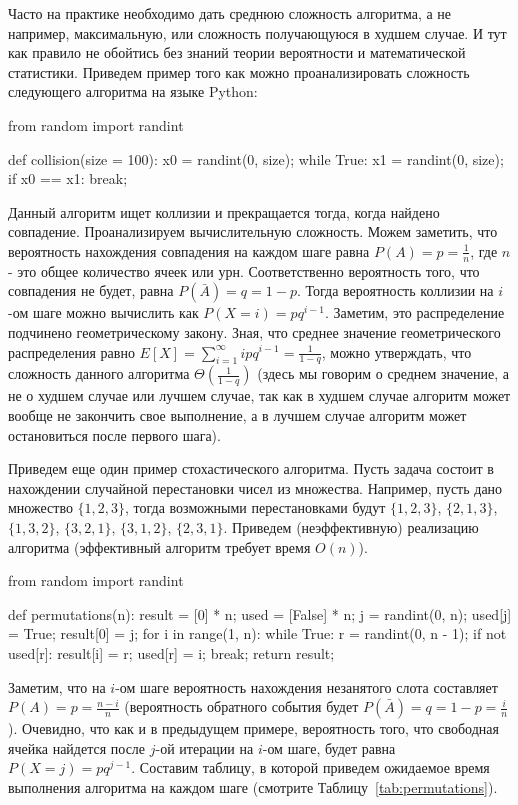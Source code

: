 Часто на практике необходимо дать среднюю сложность алгоритма,
а не например, максимальную, или сложность получающуюся в худшем случае. 
И тут как правило не обойтись без знаний теории вероятности и 
математической статистики. Приведем пример того как можно 
проанализировать сложность следующего алгоритма на языке Python:

\begin{python}
from random import randint

def collision(size = 100):
	x0 = randint(0, size);
	while True:
		x1 = randint(0, size);
		if x0 == x1:
			break;
\end{python}

Данный алгоритм ищет коллизии и прекращается тогда, когда найдено совпадение. Проанализируем
вычислительную сложность. Можем заметить, что вероятность нахождения совпадения на каждом шаге
равна $P(A) = p = \frac{1}{n}$, где $n$ - это общее количество ячеек или урн. Соответственно вероятность
того, что совпадения не будет, равна $P(\bar{A})=q=1-p$. Тогда вероятность 
коллизии на $i$-ом шаге можно вычислить как $P(X=i)=pq^{i-1}$.
Заметим, это распределение подчинено геометрическому закону.
Зная, что среднее значение геометрического распределения равно 
$E[X] = \sum_{i=1}^{\infty} ipq^{i-1} = \frac{1}{1-q}$, 
можно утверждать, что сложность данного алгоритма 
$\Theta(\frac{1}{1-q})$ (здесь мы говорим о среднем значение, а не о худшем случае или
лучшем случае, так как в худшем случае алгоритм может вообще не закончить свое 
выполнение, а в лучшем случае алгоритм может остановиться после первого шага).

Приведем еще один пример стохастического алгоритма. Пусть задача состоит в нахождении
случайной перестановки чисел из множества. Например, пусть дано множество $\{1, 2, 3\}$, 
тогда возможными перестановками будут  $\{1, 2, 3\}$, $\{2, 1, 3\}$, $\{1, 3, 2\}$,
$\{3, 2, 1\}$, $\{3, 1, 2\}$, $\{2, 3, 1\}$. Приведем (неэффективную) реализацию 
алгоритма (эффективный алгоритм требует время $O(n)$).

\begin{python}
from random import randint

def permutations(n):
	result = [0] * n;
	used = [False] * n;
	j = randint(0, n);
	used[j] = True;
	result[0] = j;
	for i in range(1, n):
		while True:
			r = randint(0, n - 1);
			if not used[r]:
				result[i] = r;
				used[r] = i;
				break;
	return result;
\end{python}

Заметим, что на $i$-ом шаге вероятность нахождения незанятого слота составляет 
$P(A) = p = \frac{n-i}{n}$ (вероятность обратного события будет 
$P(\bar{A}) = q = 1 - p =\frac{i}{n}$). Очевидно, что как и в предыдущем примере, 
вероятность того, что свободная ячейка найдется после $j$-ой итерации на $i$-ом 
шаге, будет равна $P(X=j)=pq^{j-1}$. Составим таблицу, в которой приведем 
ожидаемое время выполнения алгоритма на каждом шаге (смотрите Таблицу~\ref{tab:permutations}).

